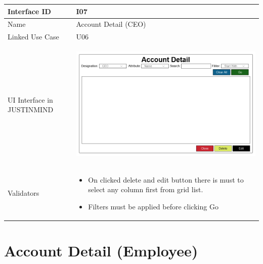 \documentclass[12pt,a4paper]{report}
\begin{document}
\begin{tabular}{ | m{3cm} | m{12cm}| } \hline

Interface ID &  I07 \\\hline

Name  	      &  Account Detail (CEO) \\ \hline

Linked Use Case & U06 \\ \hline


UI Interface in JUSTINMIND & \begin{center} \includegraphics[scale=0.3]{./User Interface/UI-006 ViewAndDelete Account@1x.png}\end{center}  \\ \hline

Validators & 
\begin{itemize}
\item   On clicked delete and edit button there is must to select any column first from grid list. 
\item  Filters must be applied before clicking Go


\end{itemize}
\\ \hline

\end{tabular} 
\section{Account Detail (Employee) }
\end{document}
